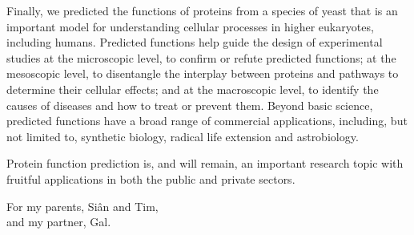 \begin{impactstatement}
Finally, we predicted the functions of proteins from a species of yeast that is an important model for understanding cellular processes in higher eukaryotes, including humans.
Predicted functions help guide the design of experimental studies at the microscopic level, to confirm or refute predicted functions; at the mesoscopic level, to disentangle the interplay between proteins and pathways to determine their cellular effects; and at the macroscopic level, to identify the causes of diseases and how to treat or prevent them.
Beyond basic science, predicted functions have a broad range of commercial applications, including, but not limited to, synthetic biology, radical life extension and astrobiology.

Protein function prediction is, and will remain, an important research topic with fruitful applications in both the public and private sectors.
\end{impactstatement}

\newenvironment{dedication}
  {\cleardoublepage           %
   \thispagestyle{empty}%
   \vspace*{\stretch{1}}%
   \itshape             %
   \raggedleft          %
  }
  {\par %
   \vspace{\stretch{3}} %
   \cleardoublepage           %
  }
\begin{dedication}
    For my parents, Si\^{a}n and Tim,\\and my partner, Gal.
\end{dedication}


